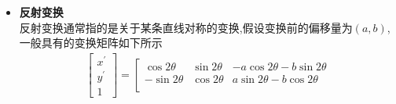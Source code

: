 \documentclass[UTF8,a4paper,10pt]{ctexart}
\begin{document}
\begin{flushleft}
\begin{itemize}
\begin{eqnarray}
\begin{array}{c}
                    x\\
                    y\\
                    1
                \end{array}\right]=\left[\begin{array}{c}
                    x+s_{y}y\\
                    y+s_{x}x\\
                    1
                \end{array}\right]\nonumber
            \end{eqnarray}
            我们这里选择了同时进行偏移变换进行处理,如图\ref{fig:fig_offset}所示
            \begin{figure}[htbp]
                \centering
                \caption{图像偏移变换}
                \label{fig:fig_offset}
            \end{figure}
            \item \textbf{反射变换}\\
            \hspace{2em}反射变换通常指的是关于某条直线对称的变换,假设变换前的偏移量为$(a,b)$,一般具有的变换矩阵如下所示
            \begin{eqnarray}
                \left[\begin{array}{c}
                    x^{\prime}\\
                    y^{\prime}\\
                    1
                \end{array}\right]=\left[\begin{array}{ccc}
                    \cos{2\theta} & \sin{2\theta} & -a\cos{2\theta}-b\sin{2\theta}\\
                    -\sin{2\theta} & \cos{2\theta} & a\sin{2\theta}-b\cos{2\theta}\\

\end{array}
\end{eqnarray}
\end{itemize}
\end{flushleft}
\end{document}
